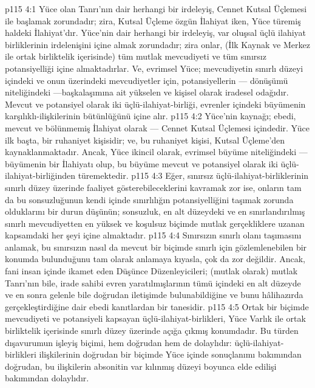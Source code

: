 \vs p115 4:1 Yüce olan Tanrı’nın  dair herhangi bir irdeleyiş, Cennet Kutsal Üçlemesi ile başlamak zorundadır; zira, Kutsal Üçleme özgün İlahiyat iken, Yüce türemiş haldeki İlahiyat’dır. Yüce’nin  dair herhangi bir irdeleyiş, var oluşsal üçlü ilahiyat birliklerinin irdelenişini içine almak zorundadır; zira onlar, (İlk Kaynak ve Merkez ile ortak birliktelik içerisinde) tüm mutlak mevcudiyeti ve tüm sınırsız potansiyelliği içine almaktadırlar. Ve, evrimsel Yüce; mevcudiyetin sınırlı düzeyi içindeki ve onun üzerindeki mevcudiyetler için, potansiyellerin --- dönüşümü niteliğindeki ---başkalaşımına ait yükselen ve kişisel olarak iradesel odağıdır. Mevcut ve potansiyel olarak iki üçlü\hyp{}ilahiyat\hyp{}birliği, evrenler içindeki büyümenin karşılıklı\hyp{}ilişkilerinin bütünlüğünü içine alır.
\vs p115 4:2 Yüce’nin kaynağı; ebedi, mevcut ve bölünmemiş İlahiyat olarak --- Cennet Kutsal Üçlemesi içindedir. Yüce ilk başta, bir ruhaniyet kişisidir; ve, bu ruhaniyet kişisi, Kutsal Üçleme’den kaynaklanmaktadır. Ancak, Yüce ikincil olarak, evrimsel büyüme niteliğindeki --- büyümenin bir İlahiyatı olup, bu büyüme mevcut ve potansiyel olarak iki üçlü\hyp{}ilahiyat\hyp{}birliğinden türemektedir.
\vs p115 4:3 Eğer, sınırsız üçlü\hyp{}ilahiyat\hyp{}birliklerinin sınırlı düzey üzerinde faaliyet gösterebileceklerini kavramak zor ise, onların tam da bu sonsuzluğunun kendi içinde sınırlılığın potansiyelliğini taşımak zorunda olduklarını bir durun düşünün; sonsuzluk, en alt düzeydeki ve en sınırlandırılmış sınırlı mevcudiyetten en yüksek ve koşulsuz biçimde mutlak gerçekliklere uzanan kapsamdaki her şeyi içine almaktadır.
\vs p115 4:4 Sınırsızın sınırlı olanı taşımasını anlamak, bu sınırsızın nasıl da mevcut bir biçimde sınırlı için gözlemlenebilen bir konumda bulunduğunu tam olarak anlamaya kıyasla, çok da zor değildir. Ancak, fani insan içinde ikamet eden Düşünce Düzenleyicileri; (mutlak olarak) mutlak Tanrı’nın bile, irade sahibi evren yaratılmışlarının tümü içindeki en alt düzeyde ve en sonra gelenle bile doğrudan iletişimde bulunabildiğine ve bunu hâlihazırda gerçekleştirdiğine dair ebedi kanıtlardan bir tanesidir.
\vs p115 4:5 Ortak bir biçimde mevcudiyeti ve potansiyeli kapsayan üçlü\hyp{}ilahiyat\hyp{}birlikleri, Yüce Varlık ile ortak birliktelik içerisinde sınırlı düzey üzerinde açığa çıkmış konumdadır. Bu türden dışavurumun işleyiş biçimi, hem doğrudan hem de dolaylıdır: üçlü\hyp{}ilahiyat\hyp{}birlikleri ilişkilerinin doğrudan bir biçimde Yüce içinde sonuçlanımı bakımından doğrudan, bu ilişkilerin absonitin var kılınmış düzeyi boyunca elde edilişi bakımından dolaylıdır.

